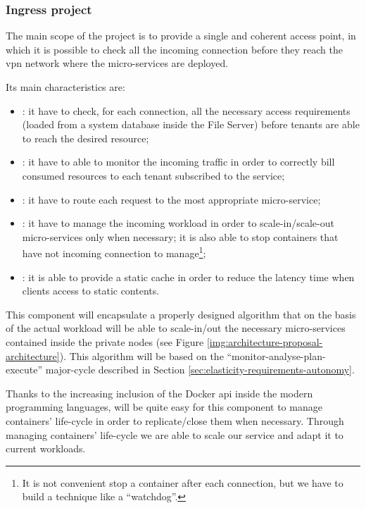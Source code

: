 \subsubsection{Ingress project}
\label{sec:architecture-proposal-architecture-ingress}
The main scope of the project is to provide a single and coherent access point, in which it is possible
to check all the incoming connection before they reach the \ac{vpn} network where the micro-services are
deployed.

Its main characteristics are:

\begin{itemize}
	\item{: it have to check, for each connection, all the necessary
		access requirements (loaded from a system database inside the File Server) before tenants are able
		to reach the desired resource;}
	\item{: it have to able to monitor the incoming traffic in order to correctly bill
		consumed resources to each tenant subscribed to the service;}
	\item{: it have to route each request to the most appropriate micro-service;}
	\item{: it have to manage the incoming workload in order to scale-in/scale-out
		micro-services only when necessary; it is also able to stop containers that have not incoming connection
		to manage\footnote{It is not convenient stop a container after each connection, but we have to build a
		technique like a ``watchdog''.};}
	\item{: it is able to provide a static cache in order to reduce the latency time
		when clients access to static contents.}
\end{itemize}

This component will encapsulate a properly designed algorithm that on the basis of the actual workload
will be able to scale-in/out the necessary micro-services contained inside the private nodes (see Figure
\ref{img:architecture-proposal-architecture}). This algorithm will be based on the 
``monitor-analyse-plan-execute'' major-cycle described in Section \ref{sec:elasticity-requirements-autonomy}.

Thanks to the increasing inclusion of the Docker \acs{api} inside the modern programming languages, will be
quite easy for this component to manage containers' life-cycle in order to replicate/close them when necessary.
Through managing containers' life-cycle we are able to scale our service and adapt it to current workloads.


